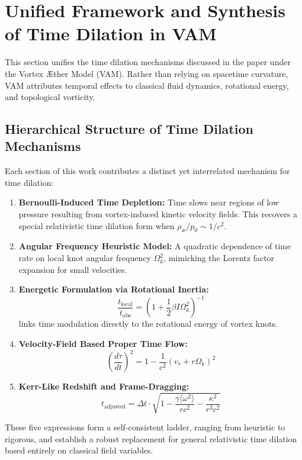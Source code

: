 \section{Unified Framework and Synthesis of Time Dilation in VAM}

This section unifies the time dilation mechanisms discussed in the paper under the Vortex Æther Model (VAM). Rather than relying on spacetime curvature, VAM attributes temporal effects to classical fluid dynamics, rotational energy, and topological vorticity.

\subsection{Hierarchical Structure of Time Dilation Mechanisms}

Each section of this work contributes a distinct yet interrelated mechanism for time dilation:

\begin{enumerate}
    \item \textbf{Bernoulli-Induced Time Depletion:} Time slows near regions of low pressure resulting from vortex-induced kinetic velocity fields. This recovers a special relativistic time dilation form when \( \rho_{\text{\ae}} / p_0 \sim 1/c^2 \).
    \item \textbf{Angular Frequency Heuristic Model:} A quadratic dependence of time rate on local knot angular frequency \( \Omega_k^2 \), mimicking the Lorentz factor expansion for small velocities.
    \item \textbf{Energetic Formulation via Rotational Inertia:}
    \[
        \boxed{\frac{t_{\text{local}}}{t_{\text{abs}}} = \left(1 + \frac{1}{2} \beta I \Omega_k^2 \right)^{-1}}
    \]
    links time modulation directly to the rotational energy of vortex knots.
    \item \textbf{Velocity-Field Based Proper Time Flow:}
    \[
        \boxed{\left( \frac{d\tau}{dt} \right)^2 = 1 - \frac{1}{c^2}(v_r + r\Omega_k)^2}
    \]
    \item \textbf{Kerr-Like Redshift and Frame-Dragging:}
    \[
        \boxed{t_{\text{adjusted}} = \Delta t \cdot \sqrt{1 - \frac{\gamma \langle \omega^2 \rangle}{rc^2} - \frac{\kappa^2}{r^3c^2}}}
    \]
\end{enumerate}

These five expressions form a self-consistent ladder, ranging from heuristic to rigorous, and establish a robust replacement for general relativistic time dilation based entirely on classical field variables.

